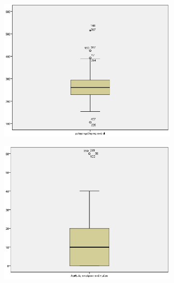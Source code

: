    \clearpage
    \begin{figure}
 \centering
            \begin{subfigure}{0.7\textwidth}
     \centering
         \includegraphics[width=\textwidth]{images/19.png}
                      \end{subfigure}
                      
     \begin{subfigure}{0.7\textwidth}
     \centering
     \vspace{1cm}
         \includegraphics[width=\textwidth]{images/20.png}
                      \end{subfigure}
    \end{figure}
    

